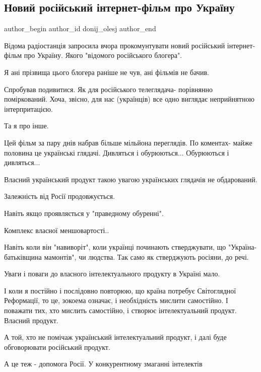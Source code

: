  
 
 
 
 
 
\subsection{Новий російський інтернет-фільм про Україну}
\label{sec:06_11_2021.fb.donij_olesj.1.film_varlamov}
 
\ifcmt
 author_begin
   author_id donij_olesj
 author_end
\fi

Відома радіостанція запросила вчора прокомунтувати новий російський інтернет-
фільм про Україну. Якого "відомого російського блогера".

Я ані прізвища цього блогера раніше не чув, ані фільмів не бачив.

Спробував подивитися. Як для російського телеглядача- порівнянно поміркований.
Хоча, звісно, для нас (українців) все одно виглядає неприйнятною інтерпритацією.

Та я про інше. 

Цей фільм за пару днів набрав більше мільйона переглядів. По коментах- майже
половина це українські глядачі. Дивляться і обурюються... Обурюються і
дивляться...

Власний український продукт такою увагою українських глядачів не обдарований.

Залежність від Росії продовжується.

Навіть якщо проявляється у "праведному обуренні".

Комплекс власної меншовартості..

Навіть коли він "навиворіт", коли українці починають стверджувати, що "Україна-
батьківщина мамонтів", чи людства. Так само як стверджують росіяни, до речі.

Уваги і поваги до власного інтелектуального продукту в Україні мало.

І коли я постійно і послідовно повторюю, що країна потребує Світоглядної
Реформації, то це, зокоема означає, і необхідність мислити самостійно. І
поважати тих, хто мислить самостійно, і створює інтелектуальний продукт.
Власний продукт.

А той, хто не помічаж український інтелектуальний продукт, і далі буде
обговорювати російський продукт.

А це теж - допомога Росії. У конкурентному змаганні інтелектів
